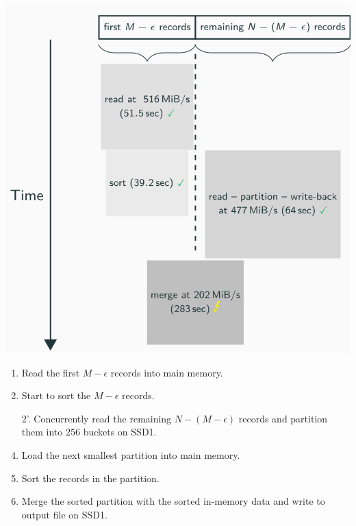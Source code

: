 \documentclass[a1paper,portrait,american,fontscale=.4]{baposter}
\begin{document}
\begin{poster}
{        \begin{minipage}[t][66mm][c]{.53\textwidth}
            \includegraphics[scale=.18]{fig/timeline.png}
        \end{minipage}%
        \begin{minipage}[t][66mm][c]{.47\textwidth}
            \begin{enumerate}
                \item Read the first $M - \epsilon$ records into main memory.
                \item Start to sort the $M - \epsilon$ records.
                \item[2'.] Concurrently read the remaining $N - (M - \epsilon)$ records and partition them into $256$ buckets
                    on SSD1.

                \item Load the next smallest partition into main memory.
                \item Sort the records in the partition.
                \item Merge the sorted partition with the sorted in-memory data and write to output file on SSD1.
            \end{enumerate}
        \end{minipage}
    }



\end{poster}
\end{document}
